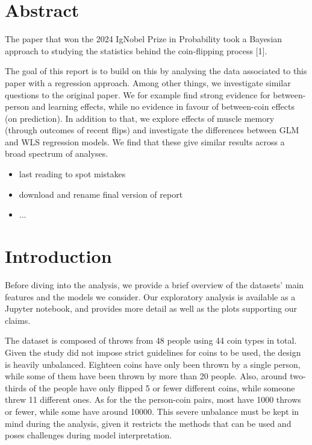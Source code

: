\documentclass[a4paper, 12pt,oneside]{article}
\begin{document}
 
	 
	\clearpage
	\tableofcontents
	\thispagestyle{empty}
	\vspace{2cm}
	\section*{Abstract}
		The paper that won the 2024 IgNobel Prize in Probability took a Bayesian approach to studying the statistics behind the coin-flipping process [1]. 

		The goal of this report is to build on this by analysing the data associated to this paper with a regression approach. Among other things, we investigate similar questions to the original paper. We for example find strong evidence for between-person and learning effects, while no evidence in favour of between-coin effects (on prediction). In addition to that, we explore effects of muscle memory (through outcomes of recent flips) and investigate the differences between GLM and WLS regression models. We find that these give similar results across a broad spectrum of analyses. 
		\begin{itemize}
			\item last reading to spot mistakes
			\item download and rename final version of report 
			\item ...
		\end{itemize}
	\clearpage
	\setcounter{page}{1}
	\section{Introduction}
		Before diving into the analysis, we provide a brief overview of the datasets' main features and the models we consider. Our exploratory analysis is available as a Jupyter notebook, and provides more detail as well as the plots supporting our claims.

		The dataset is composed of throws from 48 people using 44 coin types in total. Given the study did not impose strict guidelines for coins to be used, the design is heavily unbalanced. Eighteen coins have only been thrown by a single person, while some of them have been thrown by more than 20 people. Also, around two-thirds of the people have only flipped 5 or fewer different coins, while someone threw 11 different ones. As for the the person-coin pairs, most have 1000 throws or fewer, while some have around 10000. This severe unbalance must be kept in mind during the analysis, given it restricts the methods that can be used and poses challenges during model interpretation. 
\end{document}
